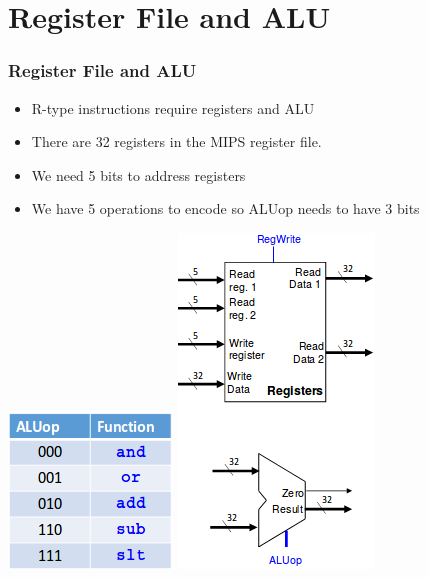 \documentclass{beamer}
\begin{document}
\section{Register File and ALU}
\begin{frame}
\frametitle{Register File and ALU}
\begin{itemize}
\item R-type instructions require registers and ALU
\item There are 32 registers in the MIPS register file.
\item We need 5 bits to address registers
\item We have 5 operations to encode so ALUop needs to have 3 bits
\end{itemize}
\includegraphics[scale=0.35]{alufunc.png}
\includegraphics[scale=0.4]{regALU.png}
\end{frame}
\end{document}
